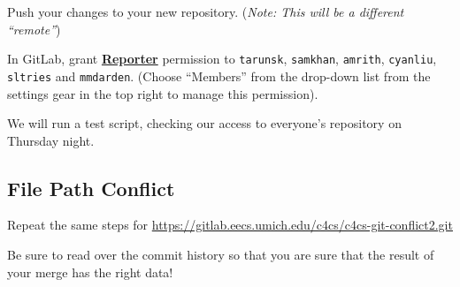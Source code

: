 \documentclass{article}
\begin{document}
Push your changes to your new repository. (\emph{\small Note: This will be a
  different ``remote''})

In GitLab, grant \textbf{\ul{Reporter}} permission to \texttt{tarunsk}, \texttt{samkhan}, \texttt{amrith}, \texttt{cyanliu}, \texttt{sltries} and
\texttt{mmdarden}.
(Choose ``Members'' from the drop-down list from the settings gear in the top
right to manage this permission).

We will run a test script, checking our access to everyone's repository on
Thursday night.

\subsection{File Path Conflict}

Repeat the same steps for
\url{https://gitlab.eecs.umich.edu/c4cs/c4cs-git-conflict2.git}

Be sure to read over the commit history so that you are sure that the result
of your merge has the right data!
\end{document}
